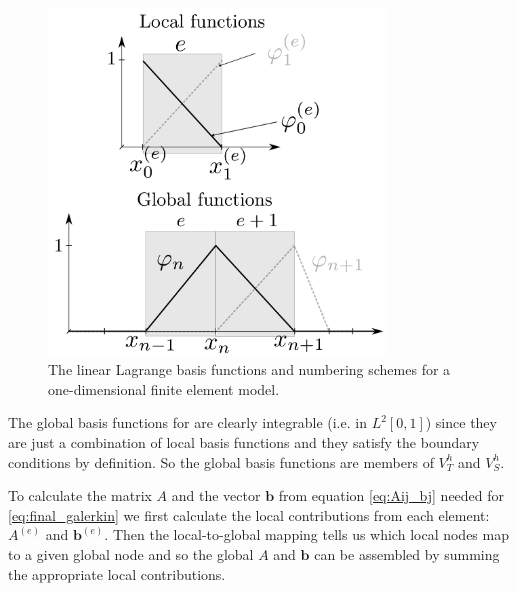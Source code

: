 \begin{figure}[!ht]
  \center
  \includegraphics[width=0.8\textwidth]{./images/local_global_functions}
  \caption{The linear Lagrange basis functions and numbering schemes for a one-dimensional
    finite element model.\label{fig:local_global_functions}}
\end{figure}

The global basis functions for are clearly integrable (i.e. in $L^2[0,1]$) since
they are just a combination of local basis functions and they satisfy the boundary conditions by definition. So the global basis functions are members of $V_T^h$ and $V_S^h$.

To calculate the matrix $A$ and the vector $\mathbf{b}$ from equation
\eqref{eq:Aij_bj} needed for \eqref{eq:final_galerkin} we first calculate the
local contributions from each element: $A^{(e)}$ and $\mathbf{b}^{(e)}$. Then the
local-to-global mapping tells us which local nodes map to a given global node
and so the global $A$ and $\mathbf{b}$ can be assembled by summing the
appropriate local contributions.

